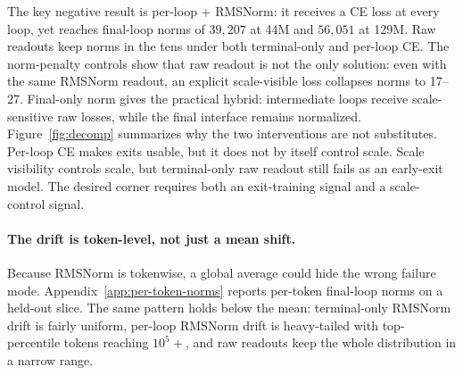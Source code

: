 The key negative result is per-loop + RMSNorm: it receives a CE loss at every loop, yet reaches final-loop norms of $39{,}207$ at 44M and $56{,}051$ at 129M.
Raw readouts keep norms in the tens under both terminal-only and per-loop CE.
The norm-penalty controls show that raw readout is not the only solution: even with the same RMSNorm readout, an explicit scale-visible loss collapses norms to 17--27.
Final-only norm gives the practical hybrid: intermediate loops receive scale-sensitive raw losses, while the final interface remains normalized.
Figure~\ref{fig:decomp} summarizes why the two interventions are not substitutes.
Per-loop CE makes exits usable, but it does not by itself control scale.
Scale visibility controls scale, but terminal-only raw readout still fails as an early-exit model.
The desired corner requires both an exit-training signal and a scale-control signal.

\paragraph{The drift is token-level, not just a mean shift.}
Because RMSNorm is tokenwise, a global average could hide the wrong failure mode.
Appendix~\ref{app:per-token-norms} reports per-token final-loop norms on a held-out slice.
The same pattern holds below the mean: terminal-only RMSNorm drift is fairly uniform, per-loop RMSNorm drift is heavy-tailed with top-percentile tokens reaching $10^5{+}$, and raw readouts keep the whole distribution in a narrow range.

